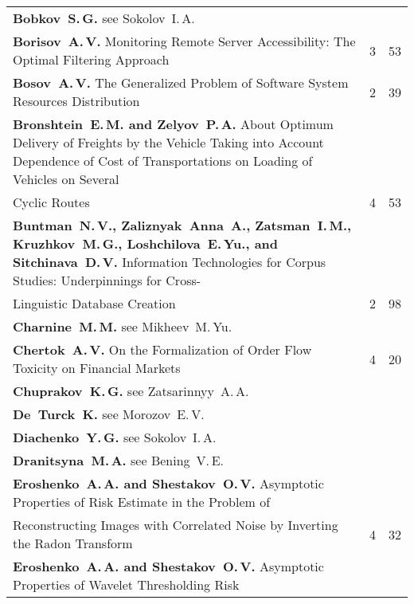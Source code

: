 {\begin{tabular}{p{399pt}rr}
\textbf{Bobkov~S.\,G.} see Sokolov~I.\,A.&&\\
\textbf{Borisov~A.\,V.} Monitoring Remote Server Accessibility: The Optimal Filtering
Approach\dotfill&3&53\\
\textbf{Bosov~A.\,V.} The Generalized Problem of Software System Resources
Distribution\dotfill&2&39\\
\hangindent=23pt\noindent\textbf{Bronshtein~E.\,M. and Zelyov~P.\,A.} About Optimum Delivery of Freights by the
Vehicle Taking into Account Dependence of Cost of Transportations on Loading of Vehicles on
Several\linebreak
\vspace*{-12pt}\\
\hspace*{23pt}Cyclic Routes\dotfill&4&53\\
\hangindent=23pt\noindent\textbf{Buntman~N.\,V., Zaliznyak~Anna~A., Zatsman~I.\,M., Kruzhkov~M.\,G.,
Loshchilova~E.\,Yu., and Sitchinava~D.\,V.} Information Technologies for Corpus Studies:
Underpinnings for Cross-\linebreak
\vspace*{-12pt}\\
\hspace*{23pt}Linguistic Database Creation\dotfill&2&98\\
\textbf{Charnine~M.\,M.} see Mikheev~M.\,Yu.&&\\
\textbf{Chertok~A.\,V.} On the Formalization of Order Flow Toxicity on Financial
Markets\dotfill&4&20\\
\textbf{Chuprakov~K.\,G.} see Zatsarinnyy~A.\,A.&&\\
\textbf{De~Turck~K.} see Morozov~E.\,V.&&\\
\textbf{Diachenko~Y.\,G.} see Sokolov~I.\,A.&&\\
\textbf{Dranitsyna~M.\,A.} see Bening~V.\,E.&&\\
\textbf{Eroshenko~A.\,A. and Shestakov~O.\,V.} Asymptotic Properties of Risk Estimate in the
Problem of\linebreak
\vspace*{-12pt}\\
\hspace*{23pt}Reconstructing Images with Correlated Noise by Inverting the Radon
Transform\dotfill&4&32\\
\textbf{Eroshenko~A.\,A. and Shestakov~O.\,V.} Asymptotic Properties of Wavelet Thresholding
Risk\linebreak
\vspace*{-12pt}\\

\end{tabular}}
